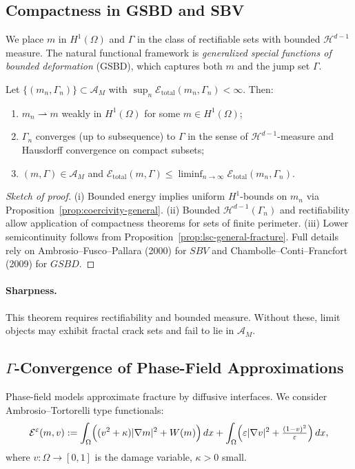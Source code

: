 \subsection{Compactness in GSBD and SBV}
We place $m$ in $H^1(\Omega)$ and $\Gamma$ in the class of rectifiable sets with bounded $\mathcal{H}^{d-1}$ measure.
The natural functional framework is \emph{generalized special functions of bounded deformation} (GSBD), which captures both $m$ and the jump set $\Gamma$.  

\begin{theorem}\label{thm:gsbd-compactness}
Let $\{(m_n,\Gamma_n)\}\subset\mathcal{A}_M$ with $\sup_n\mathcal{E}_{\mathrm{total}}(m_n,\Gamma_n)<\infty$. 
Then:
\begin{enumerate}[label=(\roman*)]
  \item $m_n \rightharpoonup m$ weakly in $H^1(\Omega)$ for some $m\in H^1(\Omega)$;
  \item $\Gamma_n$ converges (up to subsequence) to $\Gamma$ in the sense of $\mathcal{H}^{d-1}$-measure and Hausdorff convergence on compact subsets;
  \item $(m,\Gamma)\in\mathcal{A}_M$ and $\mathcal{E}_{\mathrm{total}}(m,\Gamma)\le \liminf_{n\to\infty}\mathcal{E}_{\mathrm{total}}(m_n,\Gamma_n)$.
\end{enumerate}
\end{theorem}

\begin{proof}[Sketch of proof]
(i) Bounded energy implies uniform $H^1$-bounds on $m_n$ via Proposition~\ref{prop:coercivity-general}.  
(ii) Bounded $\mathcal{H}^{d-1}(\Gamma_n)$ and rectifiability allow application of compactness theorems for sets of finite perimeter.  
(iii) Lower semicontinuity follows from Proposition~\ref{prop:lsc-general-fracture}.  
Full details rely on Ambrosio--Fusco--Pallara (2000) for $SBV$ and Chambolle--Conti--Francfort (2009) for $GSBD$.
\end{proof}

\paragraph{Sharpness.}  
This theorem requires rectifiability and bounded measure. Without these, limit objects may exhibit fractal crack sets and fail to lie in $\mathcal{A}_M$.

\subsection{$\Gamma$-Convergence of Phase-Field Approximations}
Phase-field models approximate fracture by diffusive interfaces.
We consider Ambrosio--Tortorelli type functionals:
\begin{equation}\label{eq:AT-functional}
\mathcal{E}^\varepsilon(m,v)
 := \int_\Omega \Bigl( (v^2+\kappa)|\nabla m|^2 + W(m) \Bigr)\, dx
    + \int_\Omega \Bigl( \varepsilon|\nabla v|^2 + \tfrac{(1-v)^2}{\varepsilon} \Bigr)\, dx,
\end{equation}
where $v:\Omega\to[0,1]$ is the damage variable, $\kappa>0$ small.

